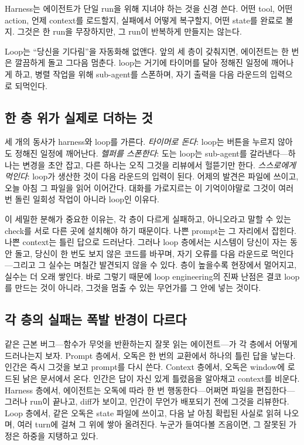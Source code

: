 \documentclass[conference]{IEEEtran}
\begin{document}
Harness는 에이전트가 단일 run을 위해 지녀야 하는 것을 신경 쓴다. 어떤 tool, 어떤 action, 언제 context를 로드할지, 실패에서 어떻게 복구할지, 어떤 state를 완료로 볼지. 그것은 한 run을 무장하지만, 그 run이 반복하게 만들지는 않는다.

Loop는 ``당신을 기다림''을 자동화해 없앤다. 앞의 세 층이 갖춰지면, 에이전트는 한 번은 깔끔하게 돌고 그다음 멈춘다. loop는 거기에 타이머를 달아 정해진 일정에 깨어나게 하고, 병렬 작업을 위해 sub-agent를 스폰하며, 자기 출력을 다음 라운드의 입력으로 되먹인다.

\subsection{한 층 위가 실제로 더하는 것}
세 개의 동사가 harness와 loop를 가른다. \emph{타이머로 돈다}: loop는 버튼을 누르지 않아도 정해진 일정에 깨어난다. \emph{헬퍼를 스폰한다}: 도는 loop는 sub-agent를 갈라낸다---하나는 변경을 초안 잡고, 다른 하나는 오직 그것을 리뷰에서 헐뜯기만 한다. \emph{스스로에게 먹인다}: loop가 생산한 것이 다음 라운드의 입력이 된다. 어제의 발견은 파일에 쓰이고, 오늘 아침 그 파일을 읽어 이어간다. 대화를 가로지르는 이 기억이야말로 그것이 여러 번 돌린 일회성 작업이 아니라 loop인 이유다.

이 세밀한 분해가 중요한 이유는, 각 층이 다르게 실패하고, 아니오라고 말할 수 있는 check를 서로 다른 곳에 설치해야 하기 때문이다. 나쁜 prompt는 그 자리에서 잡힌다. 나쁜 context는 틀린 답으로 드러난다. 그러나 loop 층에서는 시스템이 당신이 자는 동안 돌고, 당신이 한 번도 보지 않은 코드를 바꾸며, 자기 오류를 다음 라운드로 먹인다---그리고 그 실수는 며칠간 발견되지 않을 수 있다. 층이 높을수록 현장에서 멀어지고, 실수는 더 오래 쌓인다. 바로 그렇기 때문에 loop engineering의 진짜 난점은 결코 loop를 만드는 것이 아니라, 그것을 멈출 수 있는 무언가를 그 안에 넣는 것이다.

\subsection{각 층의 실패는 폭발 반경이 다르다}
같은 근본 버그---함수가 무엇을 반환하는지 잘못 읽는 에이전트---가 각 층에서 어떻게 드러나는지 보자. Prompt 층에서, 오독은 한 번의 교환에서 하나의 틀린 답을 낳는다. 인간은 즉시 그것을 보고 prompt를 다시 쓴다. Context 층에서, 오독은 window에 로드된 낡은 문서에서 온다. 인간은 답이 자신 있게 틀렸음을 알아채고 context를 비운다. Harness 층에서, 에이전트는 오독에 따라 한 번 행동한다---어쩌면 파일을 편집한다---그러나 run이 끝나고, diff가 보이고, 인간이 무언가 배포되기 전에 그것을 리뷰한다. Loop 층에서, 같은 오독은 state 파일에 쓰이고, 다음 날 아침 확립된 사실로 읽혀 나오며, 여러 turn에 걸쳐 그 위에 쌓아 올려진다. 누군가 들여다볼 즈음이면, 그 잘못된 가정은 하중을 지탱하고 있다.
\end{document}
